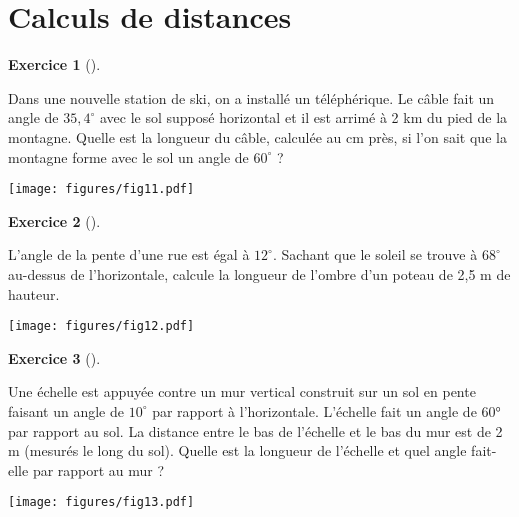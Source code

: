 \documentclass[
  a4paper,
  DIV=11,
  numbers=noendperiod,
  oneside]{scrreprt}
\theoremstyle{definition}
\theoremstyle{definition}
\newtheorem{exercise}{Exercice}[chapter]
\theoremstyle{plain}
\theoremstyle{definition}
\theoremstyle{remark}
\begin{document}
\section{Calculs de distances}\label{calculs-de-distances}

\begin{exercise}[]\protect\hypertarget{exr-}{}\label{exr-}

Dans une nouvelle station de ski, on a installé un téléphérique. Le
câble fait un angle de \(35,4^\circ\) avec le sol supposé horizontal et
il est arrimé à 2 km du pied de la montagne. Quelle est la longueur du
câble, calculée au cm près, si l'on sait que la montagne forme avec le
sol un angle de \(60^\circ\) ?

\begin{center}
\texttt{[image: figures/fig11.pdf]}
\end{center}

\end{exercise}

\begin{exercise}[]\protect\hypertarget{exr-}{}\label{exr-}

L'angle de la pente d'une rue est égal à \(12^\circ\). Sachant que le
soleil se trouve à \(68^\circ\) au-dessus de l'horizontale, calcule la
longueur de l'ombre d'un poteau de 2,5 m de hauteur.

\begin{center}
\texttt{[image: figures/fig12.pdf]}
\end{center}

\end{exercise}

\begin{exercise}[]\protect\hypertarget{exr-}{}\label{exr-}

Une échelle est appuyée contre un mur vertical construit sur un sol en
pente faisant un angle de \(10^\circ\) par rapport à l'horizontale.
L'échelle fait un angle de 60° par rapport au sol. La distance entre le
bas de l'échelle et le bas du mur est de 2 m (mesurés le long du sol).
Quelle est la longueur de l'échelle et quel angle fait-elle par rapport
au mur ?

\begin{center}
\texttt{[image: figures/fig13.pdf]}
\end{center}

\end{exercise}
\end{document}
